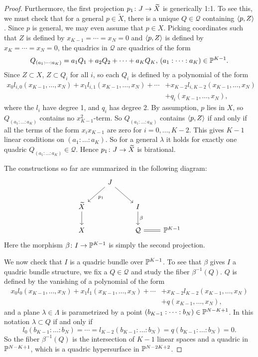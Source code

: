 \begin{proof}
 Furthermore, the first projection $p_1 \from J \to \widetilde{X}$ is generically 1:1. To see this, we must check that for a general $p \in \widetilde{X}$, there is a unique $Q \in \mathcal{Q}$ containing $\ip{p,Z}$. Since $p$ is general, we may even assume that $p \in X$. Picking coordinates such that $Z$ is defined by $x_{K-1} = \cdots = x_N = 0$ and $\ip{p,Z}$ is defined by $x_{K} = \cdots = x_N = 0$, the quadrics in $\mathcal{Q}$ are quadrics of the form
\[Q_{(a_1:\dots:a_K)} = a_1 Q_1 + a_2 Q_2 + \cdots + a_K Q_K, \, (a_1:\dots:a_K) \in \P^{K-1}.\]
Since $Z \subset X$, $Z \subset Q_i$ for all $i$, so each $Q_i$ is defined by a polynomial of the form
\begin{align*}
	x_0l_{i,0}(x_{K-1},\dots,x_N) + x_1l_{i,1}(x_{K-1},\dots,x_N) + \cdots &+ x_{K-2}l_{i,K-2}(x_{K-1},\dots,x_N) \\
	 &+ q_i(x_{K-1},\dots,x_N),
\end{align*}
where the $l_i$ have degree 1, and $q_i$ has degree 2. By assumption, $p$ lies in $X$, so $Q_{(a_1:\dots:a_K)}$ contains no $x_{K-1}^2$-term. So $Q_{(a_1:\dots:a_K)}$ contains $\ip{p,Z}$ if and only if all the terms of the form $x_ix_{K-1}$ are zero for $i = 0,\dots,K-2$. This gives $K-1$ linear conditions on $(a_1:\dots:a_K)$. So for a general $\lambda$ it holds for exactly one quadric $Q_{(a_1:\dots:a_K)} \in \mathcal{Q}$. Hence $p_1 \from J \to \widetilde{X}$ is birational.

The constructions so far are summarized in the following diagram:
\begin{equation*}
  \begin{tikzcd}
    & J \arrow["p_1",dl] \arrow[dr]&  &\\
  \widetilde{X} \arrow[d] & & I \arrow[d,"\beta"] &\\
  X             & & \mathcal{Q} \arrow[r,equal] & \P^{K-1}
  \end{tikzcd}
\end{equation*}
Here the morphism $\beta \from I \to \P^{K-1}$ is simply the second projection.

We now check that $I$ is a quadric bundle over $\P^{K-1}$. To see that $\beta$ gives $I$ a quadric bundle structure, we fix a $Q \in \mathcal{Q}$ and study the fiber $\beta^{-1}(Q)$. $Q$ is defined by the vanishing of a polynomial of the form
\begin{align*}
	x_0l_0(x_{K-1},\dots,x_N) + x_1l_1(x_{K-1},\dots,x_N) + \cdots &+ x_{K-2}l_{K-2}(x_{K-1},\dots,x_N)\\
	&+ q(x_{K-1},\dots,x_N),
\end{align*}
and a plane $\lambda \in \Lambda$ is parametrized by a point $(b_{K-1}:\cdots : b_N) \in \P^{N-K+1}$. In this notation $\lambda \subset Q$ if and only if 
\[l_0(b_{K-1}:\dots : b_N) = \cdots = l_{K-2}(b_{K-1}:\dots : b_N) = q(b_{K-1}:\dots : b_N) = 0. \]
So the fiber $\beta^{-1}(Q)$ is the intersection of $K-1$ linear spaces and a quadric in $\P^{N-K+1}$, which is a quadric hypersurface in $\P^{N-2K+2}$.


\end{proof}
